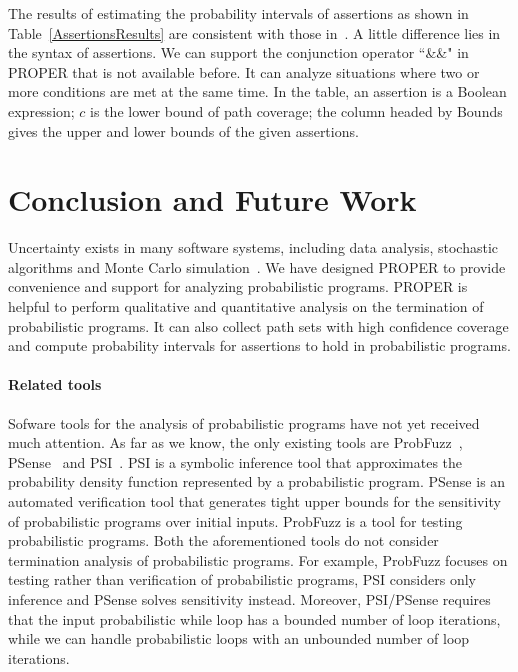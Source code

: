 \documentclass[runningheads]{llncs}
\begin{document}
The results of estimating the probability intervals of assertions as shown in Table~\ref{AssertionsResults} are consistent with those in~\cite{Sankaranarayanan2013Static}. A little difference lies in the syntax of assertions. We can support the conjunction operator  ``\&\&" in PROPER that is not available before. It can analyze situations where two or more conditions are met at the same time. In the table, an assertion is a Boolean expression; $c$ is the lower bound of path coverage; the column headed by Bounds gives the upper and lower bounds of the given assertions.


\section{Conclusion and Future Work}
Uncertainty exists in many software systems, including data analysis, stochastic algorithms and Monte Carlo simulation~\cite{HASTINGS1970Monte}. We have designed PROPER  to provide convenience and support for analyzing probabilistic programs.
PROPER is helpful to perform qualitative and quantitative analysis on the termination of probabilistic programs. It can also collect path sets with high confidence coverage and compute  probability intervals for assertions to hold in probabilistic programs.

\paragraph{Related tools}
Sofware tools for the analysis of probabilistic programs have not yet received much attention. 
As far as we know, the only existing tools are ProbFuzz~\cite{DBLP:conf/sigsoft/DuttaLHM18}, PSense~\cite{DBLP:conf/atva/HuangWM18} and PSI~\cite{DBLP:conf/cav/GehrMV16}.
PSI is a symbolic inference tool that approximates the probability density function represented by a probabilistic program. 
PSense is an automated verification tool that generates tight upper bounds for the sensitivity of probabilistic programs over initial inputs.
ProbFuzz is a tool for testing probabilistic programs. 
Both the aforementioned tools do not consider termination analysis of probabilistic programs. 
For example, ProbFuzz focuses on testing rather than verification of probabilistic programs, 
PSI considers only inference and PSense solves sensitivity instead. 
Moreover, PSI/PSense requires that the input probabilistic while loop has a bounded number of loop iterations, while we can handle probabilistic loops with an unbounded number of loop iterations.
\end{document}
